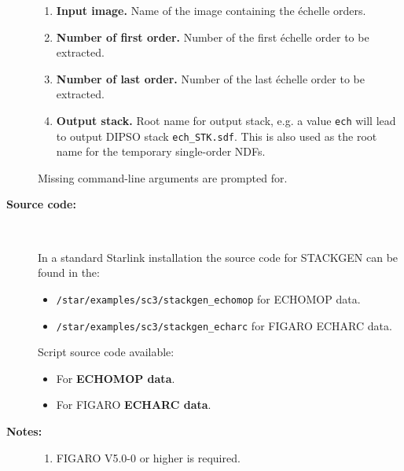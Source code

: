\documentclass[twoside,11pt]{article}
\newcommand{\htmlref}[2]{#1}
\newcommand{\xref}[3]{#1}
\begin{document}
\begin{description}
\begin{enumerate}
\item {\bf Input image.}
      Name of the image containing the \'{e}chelle orders.

\item {\bf Number of first order.}
      Number of the first \'{e}chelle order to be extracted.

\item {\bf Number of last order.}
      Number of the last \'{e}chelle order to be extracted.

\item {\bf Output stack.}
      Root name for output stack, e.g. a value \verb+ech+ will
      lead to output DIPSO stack {\tt ech\_STK.sdf}.  This is also used
      as the root name for the temporary single-order NDFs.

\end{enumerate}

     Missing command-line arguments are prompted for.

\item [{\bf Source code:}] \mbox{} \\
\begin{latex}
In a standard Starlink installation the source code for STACKGEN can be found
in the:
\begin{itemize}

\item {\tt /star/examples/sc3/stackgen\_echomop} for ECHOMOP data.

\item {\tt /star/examples/sc3/stackgen\_echarc} for FIGARO ECHARC data.

\end{itemize}
\end{latex}
\begin{htmlonly}
      Script source code available:
\begin{itemize}

\item For \htmlref{{\bf ECHOMOP data}}{se_stackgen_echomop_source}.

\item For FIGARO \htmlref{{\bf ECHARC data}}{se_stackgen_echarc_source}.

\end{itemize}
\end{htmlonly}

\item [{\bf Notes:}] \mbox{}
\begin{enumerate}

\item \xref{FIGARO}{sun86}{} V5.0-0 or higher is required.


\end{enumerate}
\end{description}
\end{document}

